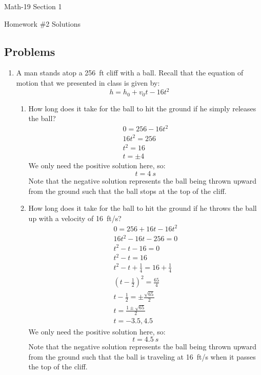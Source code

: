 \documentclass[letterpaper,12pt,fleqn]{article}
\begin{document}
\begin{center}
  \large
  Math-19 Section 1

  \Large
  Homework \#2 Solutions
\end{center}

\subsection*{Problems}

\begin{enumerate}
\item A man stands atop a \SI{256}{ft} cliff with a  ball.  Recall that the equation of motion that we presented in
  class is given by:
  \[h=h_0+v_0t-16t^2\]
  \begin{enumerate}
  \item How long does it take for the ball to hit the ground if he simply releases the ball?
    \begin{gather*}
      0=256-16t^2 \\
      16t^2=256 \\
      t^2=16 \\
      t=\pm4
    \end{gather*}
    We only need the positive solution here, so:
    \[t=\SI{4}{s}\]
    Note that the negative solution represents the ball being thrown upward from the ground such that the ball
    stops at the top of the cliff.

  \item How long does it take for the ball to hit the ground if he throws the ball up with a velocity of \SI{16}{ft/s}?
    \begin{gather*}
      0=256+16t-16t^2 \\
      16t^2-16t-256=0 \\
      t^2-t-16=0 \\
      t^2-t=16 \\
      t^2-t+\frac{1}{4}=16+\frac{1}{4} \\
      \left(t-\frac{1}{2}\right)^2=\frac{65}{4} \\
      t-\frac{1}{2}=\pm\frac{\sqrt{65}}{2} \\
      t=\frac{1\pm\sqrt{65}}{2} \\
      t=-3.5,4.5
    \end{gather*}
    We only need the positive solution here, so:
    \[t=\SI{4.5}{s}\]
    Note that the negative solution represents the ball being thrown upward from the ground such that the ball is
    traveling at \SI{16}{ft/s} when it passes the top of the cliff.


\end{enumerate}
\end{enumerate}
\end{document}
